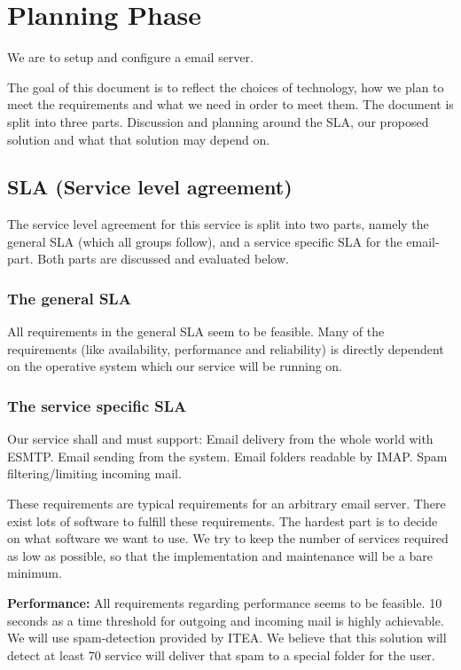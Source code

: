 \documentclass[12pt]{article}
\begin{document}

\tableofcontents

\section{Planning Phase}

We are to setup and configure a email server.

The goal of this document is to reflect the choices of technology, how
we plan to meet the requirements and what we need in order to meet them.
The document is split into three parts. Discussion and planning around
the SLA, our proposed solution and what that solution may depend on.

\subsection{SLA (Service level agreement)}
The service level agreement for this service is split into two parts,
namely the general SLA (which all groups follow), and a service specific
SLA for the email-part. Both parts are discussed and evaluated below.

\subsubsection{The general SLA}
All requirements in the general SLA seem to be feasible. Many of the
requirements (like availability, performance and reliability) is
directly dependent on the operative system which our service will be
running on. 


\subsubsection{The service specific SLA}
Our service shall and must support:
Email delivery from the whole world with ESMTP.
Email sending from the system.
Email folders readable by IMAP.
Spam filtering/limiting incoming mail.

These requirements are typical requirements for an arbitrary email
server. There exist lots of software to fulfill these requirements. The
hardest part is to decide on what software we want to use. We try to
keep the number of services required as low as possible, so that the
implementation and maintenance will be a bare minimum.

\textbf{Performance:}
All requirements regarding performance seems to be feasible. 10 seconds
as a time threshold for outgoing and incoming mail is highly achievable.
We will use spam-detection provided by ITEA. We believe that this
solution will detect at least 70%
service will deliver that spam to a special folder for the user.
\end{document}
